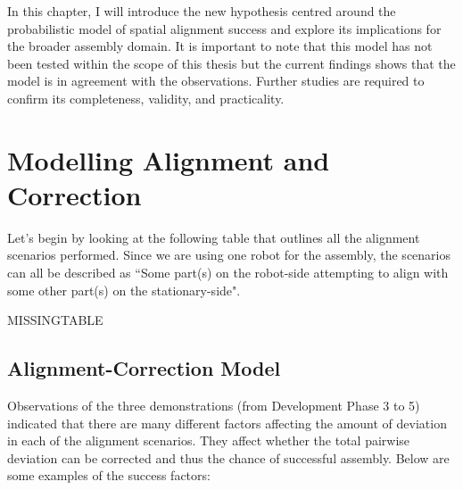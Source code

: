 In this chapter, I will introduce the new hypothesis centred around the probabilistic model of spatial alignment success and explore its implications for the broader assembly domain. It is important to note that this model has not been tested within the scope of this thesis but the current findings shows that the model is in agreement with the observations. Further studies are required to confirm its completeness, validity, and practicality. 

\section{Modelling Alignment and Correction}

Let's begin by looking at the following table that outlines all the alignment scenarios performed. Since we are using one robot for the assembly, the scenarios can all be described as ``Some part(s) on the robot-side attempting to align with some other part(s) on the stationary-side". 

MISSINGTABLE

\subsection{Alignment-Correction Model}

Observations of the three demonstrations (from Development Phase 3 to 5) indicated that there are many different factors affecting the amount of deviation in each of the alignment scenarios. They affect whether the total pairwise deviation can be corrected and thus the chance of successful assembly. Below are some examples of the success factors:

